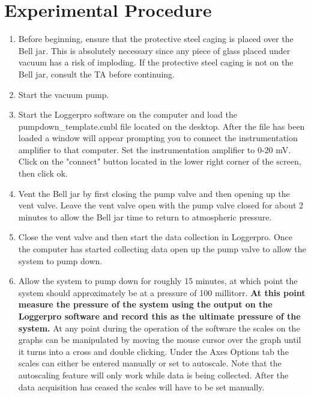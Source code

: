 \section{Experimental Procedure}
\begin{enumerate}
\item Before beginning, ensure that the protective steel caging is placed over the Bell jar. This is absolutely necessary since any piece of glass placed under vacuum has a risk of imploding. If the protective steel caging is not on the Bell jar, consult the TA before continuing.

\item Start the vacuum pump.

\item Start the Loggerpro software on the computer and load the pumpdown\_template.cmbl file located on the desktop. After the file has been loaded a window will appear prompting you to connect the instrumentation amplifier to that computer. Set the instrumentation amplifier to 0-20 mV. Click on the "connect" button located in the lower right corner of the screen, then click ok.

\item Vent the Bell jar by first closing the pump valve and then opening up the vent valve. Leave the vent valve open with the pump valve closed for about 2 minutes to allow the Bell jar time to return to atmospheric pressure.

\item Close the vent valve and then start the data collection in Loggerpro. Once the computer has started collecting data open up the pump valve to allow the system to pump down.

\item Allow the system to pump down for roughly 15 minutes, at which point the system should approximately be at a pressure of 100 millitorr. {\bf At this point measure the pressure of the system using the output on the Loggerpro software and record this as the ultimate pressure of the system.} At any point during the operation of the software the scales on the graphs can be manipulated by moving the mouse cursor over the graph until it turns into a cross and double clicking. Under the Axes Options tab the scales can either be entered manually or set to autoscale. Note that the autoscaling feature will only work while data is being collected. After the data acquisition has ceased the scales will have to be set manually.


\end{enumerate}
